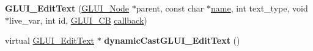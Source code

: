 \begin{DoxyCompactItemize}
\item 
\hypertarget{class_g_l_u_i___edit_text_a5aa2fc60832f1c93046a047084256474}{{\bfseries G\+L\+U\+I\+\_\+\+Edit\+Text} (\hyperlink{class_g_l_u_i___node}{G\+L\+U\+I\+\_\+\+Node} $\ast$parent, const char $\ast$\hyperlink{class_g_l_u_i___control_aa95b97d50df45335fc33f0af03958eb3}{name}, int text\+\_\+type, void $\ast$live\+\_\+var, int id, \hyperlink{class_g_l_u_i___c_b}{G\+L\+U\+I\+\_\+\+C\+B} \hyperlink{class_g_l_u_i___control_a96060fe0cc6d537e736dd6eef78e24ab}{callback})}\label{class_g_l_u_i___edit_text_a5aa2fc60832f1c93046a047084256474}

\item 
\hypertarget{class_g_l_u_i___edit_text_ae9c522ef7fbeb671ff4ff3d5415aa804}{virtual \hyperlink{class_g_l_u_i___edit_text}{G\+L\+U\+I\+\_\+\+Edit\+Text} $\ast$ {\bfseries dynamic\+Cast\+G\+L\+U\+I\+\_\+\+Edit\+Text} ()}\label{class_g_l_u_i___edit_text_ae9c522ef7fbeb671ff4ff3d5415aa804}

\end{DoxyCompactItemize}
